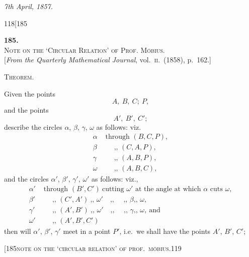 \documentclass[11pt]{article}
\begin{document}
\medskip
\textit{7th April, 1857.}

\bigskip
\begin{center}\small\textsc{118}\hfill[185\end{center}

\begin{center}
\textbf{185.}\\[0.5em]
\textsc{Note on the `Circular Relation' of Prof. M\"obius.}\\[0.4em]
\small [\textit{From the Quarterly Mathematical Journal}, vol.\ \textsc{ii}.\ (1858), p.\ 162.]
\end{center}

\medskip
\noindent \textsc{Theorem.}

Given the points
\[
A,\ B,\ C;\ P,
\]
and the points
\[
A',\ B',\ C';
\]
describe the circles $\alpha$, $\beta$, $\gamma$, $\omega$ as follows: viz.
\begin{align*}
\alpha &\text{ through } (B,C,P),\\
\beta &\quad\;\; \text{,, } (C,A,P),\\
\gamma &\quad\;\; \text{,, } (A,B,P),\\
\omega &\quad\;\; \text{,, } (A,B,C),
\end{align*}
and the circles $\alpha'$, $\beta'$, $\gamma'$, $\omega'$ as follows: viz.,
\begin{align*}
\alpha' &\text{ through } (B',C')\ \text{cutting } \omega' \text{ at the angle at which } \alpha \text{ cuts } \omega,\\
\beta' &\quad\;\; \text{,, } (C',A')\ \text{,, } \omega' \quad\text{,, } \quad\text{,, } \beta \text{,, } \omega,\\
\gamma' &\quad\;\; \text{,, } (A',B')\ \text{,, } \omega' \quad\text{,, } \quad\text{,, } \gamma \text{,, } \omega,\ \text{and}\\
\omega' &\quad\;\; \text{,, } (A',B',C')
\end{align*}
then will $\alpha'$, $\beta'$, $\gamma'$ meet in a point $P'$, i.e.\ we shall have the points $A'$, $B'$, $C'$;

\begin{center}\small[185\hfill\textsc{note on the `circular relation' of prof.\ m\"obius.}\hfill\textsc{119}\end{center}
\end{document}
